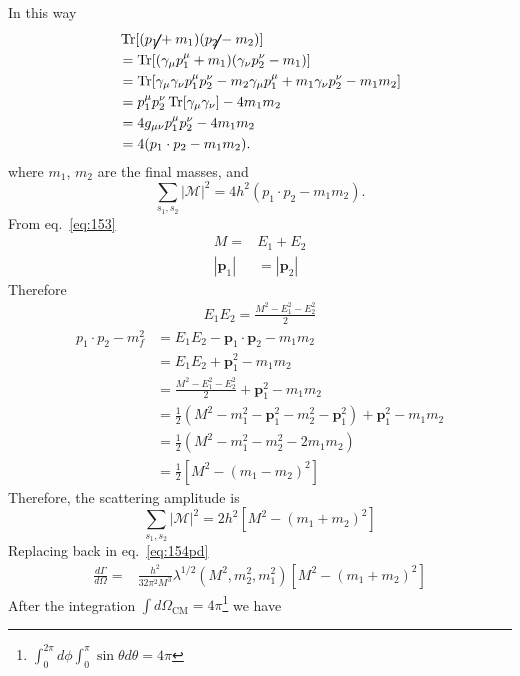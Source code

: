 In this way
\begin{align*}
&\operatorname{Tr}[(\cancel{p}_{1}+m_{1})(\cancel{p}_{2}-m_{2})]\\
&=\operatorname{Tr}[(\gamma_{\mu}p^{\mu}_{1}+m_{1})(\gamma_{\nu}p^{\nu}_{2}-m_{1})]\\
&=\operatorname{Tr}[\gamma_{\mu}\gamma_{\nu}p^{\mu}_{1}p^{\nu}_{2}-m_{2}\gamma_{\mu}p^{\mu}_{1}+m_{1}\gamma_{\nu}p^{\nu}_{2}-m_{1}m_2]\\
&=p^{\mu}_{1}p^{\nu}_{2}\operatorname{Tr}[\gamma_{\mu}\gamma_{\nu}]-4m_1 m_2\\
&=4g_{\mu\nu}p^{\mu}_{1}p^{\nu}_{2}-4m_1m_2\\
&=4(p_{1}\cdot p_{2}-m_1m_2). 
\end{align*}
where  $m_1$, $m_2$ are the final masses, and
\begin{equation*}
\sum_{s_1,s_2}|\mathcal{M}|^{2}=4h^2(p_{1}\cdot p_{2}-m_{1}m_2).
\end{equation*}
From eq.~\eqref{eq:153}
\begin{align}
  M=&E_1+E_2\nonumber\\
|\mathbf{p}_1|&=|\mathbf{p}_2|
\end{align}
Therefore
\begin{align}
  E_1E_2=\frac{M^2-E_1^2-E_2^2}{2}
\end{align}
\begin{align*}
p_{1}\cdot p_{2}-m^{2}_{f}&=E_{1}E_{2}-\mathbf{p}_{1}\cdot\mathbf{p}_{2}-m_1 m_2\\
&=E_{1}E_{2}+\mathbf{p}_{1}^2-m_1 m_2\\
&=\frac{M^2-E_1^2-E_2^2}{2}+\mathbf{p}_{1}^2-m_1 m_2\nonumber\\
&=\frac12\left(M^2-m_1^2-\mathbf{p}_1^2-m_2^2-\mathbf{p}_1^2\right)+\mathbf{p}_{1}^2-m_1 m_2\\
&=\frac12\left(M^2-m_1^2-m_2^2-2m_1m_2\right)\\
&=\frac12\left[M^2-(m_1-m_2)^2\right]
\end{align*}
Therefore, the scattering  amplitude is
\begin{equation}
\sum_{s_1,s_2}|\mathcal{M}|^{2}=2h^2\left[M^2-(m_1+m_2)^2\right]
\label{eq:82}
\end{equation}
Replacing back in eq.~\eqref{eq:154pd}
\begin{align}
\frac{d\Gamma}{d\Omega}=
&\frac{h^2}{32 \pi^2M^3}\lambda^{1/2}(M^2,m_2^2,m_1^2)\left[M^2-(m_1+m_2)^2\right]
\end{align}
After the integration $\int d\Omega_{\text{CM}}=4\pi$\footnote{$\int_0^{2\pi}d\phi\int_0^\pi\sin\theta d\theta=4\pi $} we have
